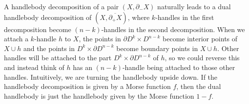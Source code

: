 A handlebody decomposition of a pair $(X,\partial_- X)$ naturally leads to a dual handlebody decomposition of $(X,\overline{\partial_+ X})$, where $k$-handles in the first decomposition become $(n-k)$-handles in the second decomposition. When we attach a $k$-handle $h$ to $X$, the points in $\partial D^k \times D^{n-k}$ become interior points of $X \cup h$ and the points in $D^k \times \partial D^{n-k}$ become boundary points in $X \cup h$. Other handles will be attached to the part $D^k \times \partial D^{n-k}$ of $h$, so we could reverse this and instead think of $h$ has an $(n-k)$-handle being attached to those other handles. Intuitively, we are turning the handlebody upside down. If the handlebody decomposition is given by a Morse function $f$, then the dual handlebody is just the handlebody given by the Morse function $1-f$. 



